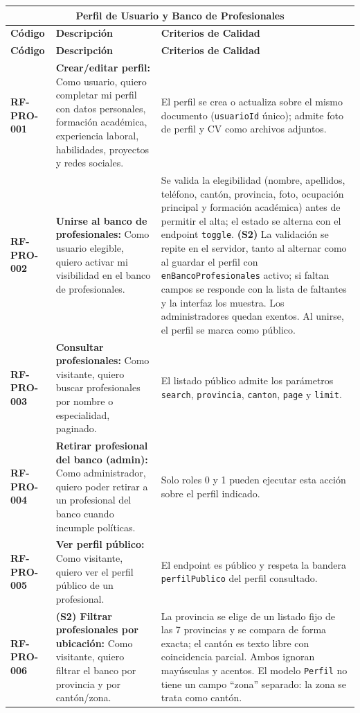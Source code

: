 \begin{longtable}{|l||p{7cm}|p{4.5cm}|}

\multicolumn{3}{c}{Perfil de Usuario y Banco de Profesionales}\\
\hline\hline
\textbf{Código} & \textbf{Descripción} & \textbf{Criterios de Calidad}\\
\hline
\endfirsthead
\textbf{Código} & \textbf{Descripción} & \textbf{Criterios de Calidad}\\
\hline\hline
\endhead

\textbf{RF-PRO-001} & \textbf{Crear/editar perfil:} Como usuario, quiero completar mi perfil con datos personales, formación académica, experiencia laboral, habilidades, proyectos y redes sociales. & El perfil se crea o actualiza sobre el mismo documento (\texttt{usuarioId} único); admite foto de perfil y CV como archivos adjuntos. \\
\hline
\textbf{RF-PRO-002} & \textbf{Unirse al banco de profesionales:} Como usuario elegible, quiero activar mi visibilidad en el banco de profesionales. & Se valida la elegibilidad (nombre, apellidos, teléfono, cantón, provincia, foto, ocupación principal y formación académica) antes de permitir el alta; el estado se alterna con el endpoint \texttt{toggle}. \textbf{(S2)} La validación se repite en el servidor, tanto al alternar como al guardar el perfil con \texttt{enBancoProfesionales} activo; si faltan campos se responde con la lista de faltantes y la interfaz los muestra. Los administradores quedan exentos. Al unirse, el perfil se marca como público. \\
\hline
\textbf{RF-PRO-003} & \textbf{Consultar profesionales:} Como visitante, quiero buscar profesionales por nombre o especialidad, paginado. & El listado público admite los parámetros \texttt{search}, \texttt{provincia}, \texttt{canton}, \texttt{page} y \texttt{limit}. \\
\hline
\textbf{RF-PRO-004} & \textbf{Retirar profesional del banco (admin):} Como administrador, quiero poder retirar a un profesional del banco cuando incumple políticas. & Solo roles 0 y 1 pueden ejecutar esta acción sobre el perfil indicado. \\
\hline
\textbf{RF-PRO-005} & \textbf{Ver perfil público:} Como visitante, quiero ver el perfil público de un profesional. & El endpoint es público y respeta la bandera \texttt{perfilPublico} del perfil consultado. \\
\hline
\textbf{RF-PRO-006} & \textbf{(S2) Filtrar profesionales por ubicación:} Como visitante, quiero filtrar el banco por provincia y por cantón/zona. & La provincia se elige de un listado fijo de las 7 provincias y se compara de forma exacta; el cantón es texto libre con coincidencia parcial. Ambos ignoran mayúsculas y acentos. El modelo \texttt{Perfil} no tiene un campo ``zona'' separado: la zona se trata como cantón. \\

\end{longtable}
